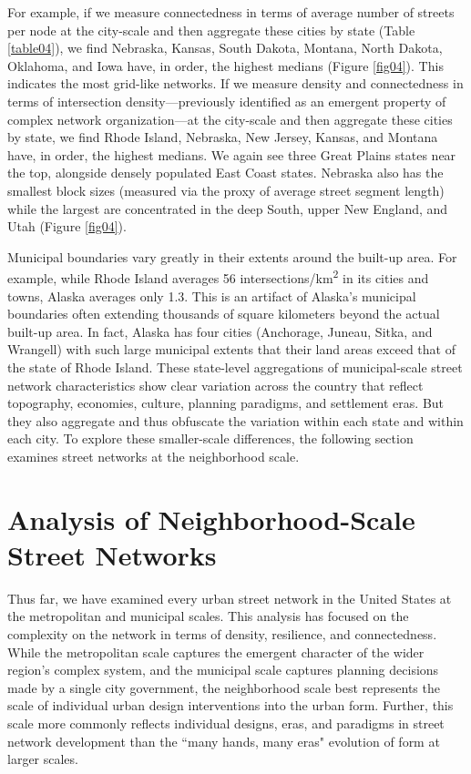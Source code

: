 \documentclass{article}
\begin{document}
For example, if we measure connectedness in terms of average number of streets per node at the city-scale and then aggregate these cities by state (Table \ref{table04}), we find Nebraska, Kansas, South Dakota, Montana, North Dakota, Oklahoma, and Iowa have, in order, the highest medians (Figure \ref{fig04}). This indicates the most grid-like networks. If we measure density and connectedness in terms of intersection density---previously identified as an emergent property of complex network organization---at the city-scale and then aggregate these cities by state, we find Rhode Island, Nebraska, New Jersey, Kansas, and Montana have, in order, the highest medians. We again see three Great Plains states near the top, alongside densely populated East Coast states. Nebraska also has the smallest block sizes (measured via the proxy of average street segment length) while the largest are concentrated in the deep South, upper New England, and Utah (Figure \ref{fig04}).

Municipal boundaries vary greatly in their extents around the built-up area. For example, while Rhode Island averages 56 intersections/km\textsuperscript{2} in its cities and towns, Alaska averages only 1.3. This is an artifact of Alaska's municipal boundaries often extending thousands of square kilometers beyond the actual built-up area. In fact, Alaska has four cities (Anchorage, Juneau, Sitka, and Wrangell) with such large municipal extents that their land areas exceed that of the state of Rhode Island. These state-level aggregations of municipal-scale street network characteristics show clear variation across the country that reflect topography, economies, culture, planning paradigms, and settlement eras. But they also aggregate and thus obfuscate the variation within each state and within each city. To explore these smaller-scale differences, the following section examines street networks at the neighborhood scale.

\section{Analysis of Neighborhood-Scale Street Networks}

Thus far, we have examined every urban street network in the United States at the metropolitan and municipal scales. This analysis has focused on the complexity on the network in terms of density, resilience, and connectedness. While the metropolitan scale captures the emergent character of the wider region's complex system, and the municipal scale captures planning decisions made by a single city government, the neighborhood scale best represents the scale of individual urban design interventions into the urban form. Further, this scale more commonly reflects individual designs, eras, and paradigms in street network development than the ``many hands, many eras" evolution of form at larger scales.
\end{document}
